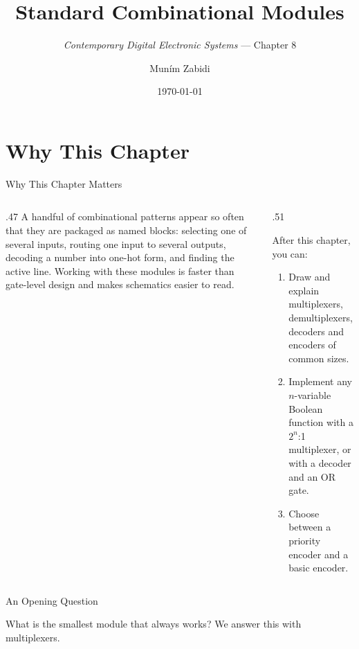 \documentclass[9pt,aspectratio=169,xcolor=table]{beamer}
\title{Standard Combinational Modules}
\subtitle{\emph{Contemporary Digital Electronic Systems} --- Chapter 8}
\author{Mun\'{i}m Zabidi}
\institute{\color{primary}Faculty of Electrical Engineering, Universiti Teknologi Malaysia}
\date{\today}
\begin{document}
\titlepage

\section{Why This Chapter}

\begin{frame}{Why This Chapter Matters}
  \begin{columns}[c]
  \begin{column}{.47\textwidth}
    A handful of combinational patterns appear so often that they are packaged as named blocks: selecting one of several inputs, routing one input to several outputs, decoding a number into one-hot form, and finding the active line. Working with these modules is faster than gate-level design and makes schematics easier to read.
  \end{column}
  \begin{column}{.51\textwidth}
    \begin{block}{After this chapter, you can:}
    {\small
    \begin{enumerate}\itemsep2pt
      \item Draw and explain multiplexers, demultiplexers, decoders and encoders of common sizes.
      \item Implement any $n$-variable Boolean function with a $2^n$:1 multiplexer, or with a decoder and an OR gate.
      \item Choose between a priority encoder and a basic encoder.
    \end{enumerate}}
    \end{block}
  \end{column}
  \end{columns}
\end{frame}

\begin{frame}{An Opening Question}
  \leavevmode\vspace{4mm}
  \begin{center}
  \end{center}
  \vspace{4mm}
  What is the smallest module that always works? We answer this with multiplexers.
\end{frame}
\end{document}
